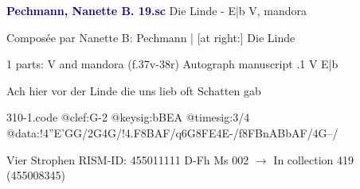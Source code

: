 \documentclass[twocolumn]{book}
\begin{document}
\newline \par \vspace{7pt} \textcolor{darkblue}{\textbf{Pechmann, Nanette B.  19.sc}}
\newline Die Linde - E|b
\newline V, mandora
\newline \begin{itshape}[heading, f.37v:] Composée par Nanette B: Pechmann | [at right:] Die Linde\end{itshape} 
\newline \textcolor{darkblue}{}  1 parts: V and mandora  (f.37v-38r)
\newline Autograph manuscript
.1  V  E|b
\newline \begin{footnotesize} Ach hier vor der Linde die uns lieb oft Schatten gab \end{footnotesize}  
\begin{filecontents*}{310-1.code}
@clef:G-2
@keysig:bBEA
@timesig:3/4
@data:!4''E'GG/2G4G/!4.F8BAF/q6G{8FE}4E-/f{8FBnABbAF}/4G--/
\end{filecontents*}
\newline
%

\newline Vier Strophen
\newline RISM-ID: 455011111
\newline D-Fh  Ms 002
\newline $\rightarrow$ In collection 419 (455008345)
      
\end{document}
